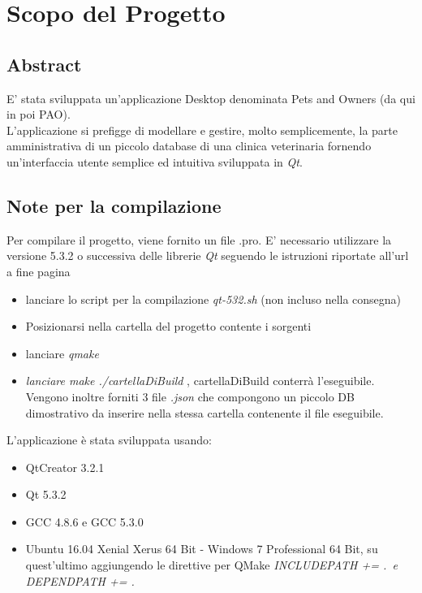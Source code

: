 \chapter{Scopo del Progetto} 
 
\section{Abstract}

E' stata sviluppata un'applicazione Desktop denominata Pets and Owners (da qui in poi PAO). \\
L'applicazione si prefigge di modellare e gestire, molto semplicemente, la parte amministrativa di un piccolo database di una clinica veterinaria fornendo un'interfaccia utente semplice ed intuitiva sviluppata in \textit{Qt}.

\section{Note per la compilazione}
Per compilare il progetto, viene fornito un file .pro. E' necessario utilizzare la versione 5.3.2 o successiva delle librerie \textit{Qt} seguendo le istruzioni riportate all'url a fine pagina 
\begin{itemize}
	\item lanciare lo script per la compilazione \textit{qt-532.sh} (non incluso nella consegna)
	\item Posizionarsi nella cartella del progetto contente i sorgenti
	\item lanciare \textit{qmake} 
	\item \textit{lanciare make ./cartellaDiBuild} , cartellaDiBuild conterrà l'eseguibile.\\ Vengono inoltre forniti 3 file \textit{.json} che compongono un piccolo DB dimostrativo da inserire nella stessa cartella contenente il file eseguibile. 
\end{itemize}

L'applicazione è stata sviluppata usando:
\begin{itemize}
	\item QtCreator 3.2.1
	\item Qt 5.3.2
	\item GCC 4.8.6 e GCC 5.3.0
	\item Ubuntu 16.04 Xenial Xerus 64 Bit - Windows 7 Professional 64 Bit, su quest'ultimo aggiungendo le direttive per QMake \textit{ INCLUDEPATH += .\ e  DEPENDPATH += .\ } 
\end{itemize}

